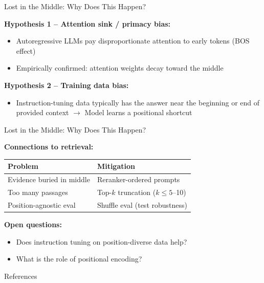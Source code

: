 \documentclass[11pt,compress,t,notes=noshow, xcolor=table]{beamer}
\begin{document}

\begin{frame}{Lost in the Middle: Why Does This Happen?}

\vfill

\textbf{Hypothesis 1 -- Attention sink / primacy bias:}
\begin{itemize}
    \item Autoregressive LLMs pay disproportionate attention to early tokens (BOS effect)
    \item Empirically confirmed: attention weights decay toward the middle
\end{itemize}

\vfill

\textbf{Hypothesis 2 -- Training data bias:}
\begin{itemize}
    \item Instruction-tuning data typically has the answer near the beginning or end of provided context $\to$ Model learns a positional shortcut
\end{itemize}

\vfill

\end{frame}


\begin{frame}{Lost in the Middle: Why Does This Happen?}

\vfill
\textbf{Connections to retrieval:}
\begin{center}
\small
\begin{tabular}{ll}
\toprule
\textbf{Problem} & \textbf{Mitigation} \\
\midrule
Evidence buried in middle & Reranker-ordered prompts \\
Too many passages & Top-$k$ truncation ($k \leq 5$--10) \\
Position-agnostic eval & Shuffle eval (test robustness) \\
\bottomrule
\end{tabular}
\end{center}

\vfill

\textbf{Open questions:} 
	\begin{itemize}
		\item Does instruction tuning on position-diverse data help? 
		\item What is the role of positional encoding? 
	\end{itemize}

\vfill

\end{frame}


\begin{frame}{References}
        \tiny
        
\end{frame}

\endlecture
\end{document}

